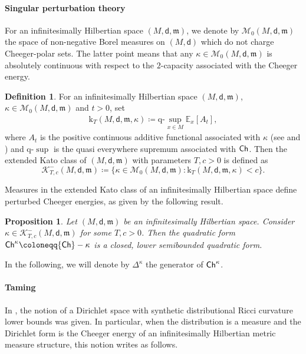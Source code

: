\documentclass[10pt]{article}
\newcommand{\K}{\mathscr{K}}
\newcommand{\m}{\mathfrak{m}}
\newcommand{\M}{{\mathit{M}}}
\renewcommand{\k}{\mathrm{k}}
\newcommand{\dist}{\mathsf{d}}
\newcommand{\df}{\coloneqq}
\newcommand{\Ch}{{\sf Ch}}
\theoremstyle{plain}
\newtheorem{proposition}[theorem]{Proposition}
\theoremstyle{definition}
\newtheorem{definition}[theorem]{Definition}
\begin{document}
\paragraph{Singular perturbation theory} For an infinitesimally Hilbertian  space $ (M,\dist,\m)$, we denote by $\mathcal{M}_0(M,\dist,\m)$ the space of non-negative Borel measures on $(M,\dist)$ which do not charge Cheeger-polar sets. The latter point means that any $\kappa \in \mathcal{M}_0(M,\dist,\m)$ is absolutely continuous with respect to the $2$-capacity associated with the Cheeger energy.

\begin{definition}\label{def:Kato}
For  an infinitesimally Hilbertian  space $ (M,\dist,\m)$, $\kappa \in \mathcal{M}_0(M,\dist,\m)$ and $t>0$, set
\begin{align*}
\k_T(\M,\dist,\m,\kappa)\df\text{q-}\sup_{x \in M} \mathbb{E}_x[A_t],
\end{align*}
where $A_t$ is the positive continuous additive functional associated with $\kappa$ (see \cite[Theorems 4.2.6 and 6.7.2]{CF} and \cite[Lemma 2.11]{ERST}) and q-$\sup$ is the quasi everywhere supremum associated with $\Ch$. Then the extended Kato class of $(M,\dist,\m)$ with parameters $T,c>0$ is defined as
\[
\K^-_{T,c}(\M,\dist,\m) \df \{ \kappa \in \mathcal{M}_0(M,\dist,\m) : \k_T(M,\dist,\m,\kappa)<c \}.
\]
\end{definition}

Measures in the extended Kato class of  an infinitesimally Hilbertian space define perturbed Cheeger energies, as given by the following result.

\begin{proposition}
    Let $ (M,\dist,\m)$ be an infinitesimally Hilbertian  space. Consider $\kappa \in \K^-_{T,c}(\M,\dist,\m)$ for some $T,c>0$. Then the quadratic form $\Ch^\kappa \df \Ch-\kappa$ is a closed, lower semibounded quadratic form.
\end{proposition}

In the following, we will denote by $\Delta^\kappa$ the generator of $\Ch^\kappa$.


\paragraph{Taming} In \cite{ERST}, the notion of a Dirichlet space with synthetic distributional Ricci curvature lower bounds was given. In particular, when the distribution is a measure and the Dirichlet form is the Cheeger energy of an infinitesimally Hilbertian metric measure structure, this notion writes as follows.
\end{document}
